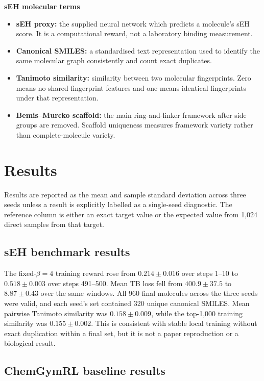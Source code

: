 \documentclass{article}
\begin{document}
\textbf{sEH molecular terms}
\begin{itemize}
    \item \textbf{sEH proxy:} the supplied neural network which predicts a molecule's sEH score. It is a computational reward, not a laboratory binding measurement.
    \item \textbf{Canonical SMILES:} a standardised text representation used to identify the same molecular graph consistently and count exact duplicates.
    \item \textbf{Tanimoto similarity:} similarity between two molecular fingerprints. Zero means no shared fingerprint features and one means identical fingerprints under that representation.
    \item \textbf{Bemis--Murcko scaffold:} the main ring-and-linker framework after side groups are removed. Scaffold uniqueness measures framework variety rather than complete-molecule variety.
\end{itemize}

\section{Results}

Results are reported as the mean and sample standard deviation across three seeds unless a result is explicitly labelled as a single-seed diagnostic. The reference column is either an exact target value or the expected value from 1,024 direct samples from that target.

\subsection{sEH benchmark results}

The fixed-$\beta=4$ training reward rose from $0.214\pm0.016$ over steps 1--10 to $0.518\pm0.003$ over steps 491--500. Mean TB loss fell from $400.9\pm37.5$ to $8.87\pm0.43$ over the same windows. All 960 final molecules across the three seeds were valid, and each seed's set contained 320 unique canonical SMILES. Mean pairwise Tanimoto similarity was $0.158\pm0.009$, while the top-1,000 training similarity was $0.155\pm0.002$. This is consistent with stable local training without exact duplication within a final set, but it is not a paper reproduction or a biological result.

\subsection{ChemGymRL baseline results}
\end{document}
